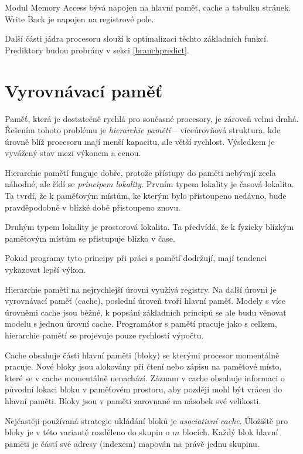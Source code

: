 Modul Memory Access bývá napojen na hlavní paměť, cache a tabulku stránek.
Write Back je napojen na registrové pole.

Další části jádra procesoru slouží k optimalizaci těchto základních funkcí.
Prediktory budou probrány v sekci \ref{branchpredict}.

\section{Vyrovnávací paměť}
\label{cache}

Paměť, která je dostatečně rychlá pro současné procesory, je zároveň velmi drahá.
Řešením tohoto problému je \emph{hierarchie pamětí} -- víceúrovňová struktura, kde úrovně blíž procesoru mají menší kapacitu, ale větší rychlost.
Výsledkem je vyvážený stav mezi výkonem a cenou.

Hierarchie pamětí funguje dobře, protože přístupy do paměti nebývají zcela náhodné, ale řídí se \emph{principem lokality}.
Prvním typem lokality je časová lokalita.
Ta tvrdí, že k paměťovým místům, ke kterým bylo přistoupeno nedávno, bude pravděpodobně v blízké době přistoupeno znovu.

Druhým typem lokality je prostorová lokalita.
Ta předvídá, že k fyzicky blízkým paměťovým místům se přistupuje blízko v čase.

Pokud programy tyto principy při práci s pamětí dodržují, mají tendenci vykazovat lepší výkon.
\cite{QuantApproach}

Hierarchie pamětí na nejrychlejší úrovni využívá registry.
Na další úrovni je vyrovnávací paměť (cache), poslední úroveň tvoří hlavní paměť.
Modely s více úrovněmi cache jsou běžné, k popsání základních principů se ale budu věnovat modelu s jednou úrovní cache.
Programátor s pamětí pracuje jako s celkem, hierarchie pamětí se projevuje pouze rychlostí výpočtu.

Cache obsahuje části hlavní paměti (bloky) se kterými procesor momentálně pracuje.
Nové bloky jsou alokovány při čtení nebo zápisu na paměťové místo, které se v cache momentálně nenachází.
Záznam v cache obsahuje informaci o původní lokaci bloku v paměťovém prostoru, aby později mohl být vrácen do hlavní paměti.
Bloky jsou v paměti zarovnané na násobek své velikosti.

Nejčastěji používaná strategie ukládání bloků je \emph{asociativní cache}.
Úložiště pro bloky je v této variantě rozděleno do skupin o $m$ blocích.
Každý blok hlavní paměti je částí své adresy (indexem) mapován na právě jednu skupinu.

